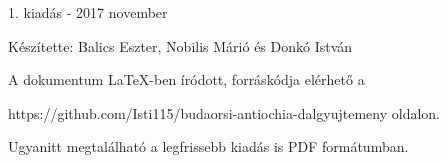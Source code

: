 \documentclass[a5paper,twoside]{article}
\renewcommand{\_}[1]{\underline{#1}} %
\begin{document}
  \renewcommand{\thesongnum}{M\arabic{songnum}}
  \setlength{\songnumwidth}{1.25cm}
  \begin{songs}{}
    
  \end{songs}

  \newpage
  \thispagestyle{empty}

  \vspace*{\fill}
  1. kiadás - 2017 november

  \vspace{0.3cm}

  Készítette: Balics Eszter, Nobilis Márió és Donkó István

  \vspace{0.3cm}

  A dokumentum LaTeX-ben íródott, forráskódja elérhető a

  https://github.com/Isti115/budaorsi-antiochia-dalgyujtemeny oldalon.

  Ugyanitt megtalálható a legfrissebb kiadás is PDF formátumban.
\end{document}
